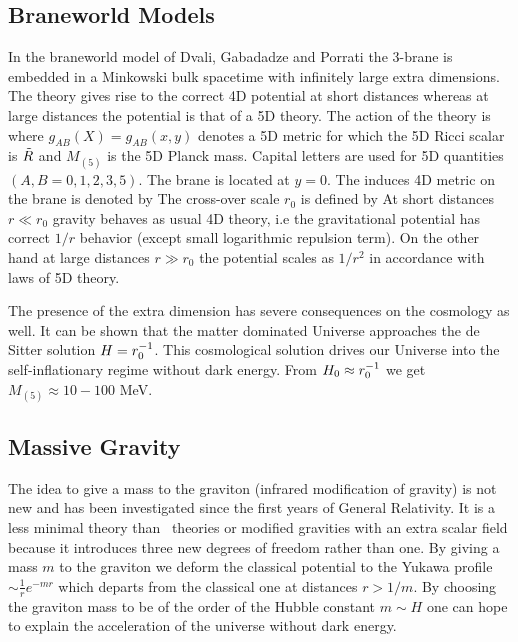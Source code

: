 \subsection{Braneworld Models}
In the braneworld model of Dvali, Gabadadze and Porrati \parencite[DGP model][]{2000PhLB..485..208D} the 3-brane is embedded in a Minkowski bulk spacetime with infinitely large extra dimensions. The theory gives rise to the correct 4D potential at short distances whereas at large distances the potential is that of a 5D theory. The action of the theory is
where $g_{AB}(X)=g_{AB}(x,y)$ denotes a 5D metric for which the 5D Ricci scalar is ${\tilde{R}}$ and $M_{(5)}$ is the 5D Planck mass. Capital letters are used for 5D quantities $(A,B=0,1,2,3,5)$. The brane is located at $y=0$. The induces 4D metric on the brane is denoted by
The cross-over scale $r_0$ is defined by
At short distances $r\ll r_0$ gravity behaves as usual 4D theory, i.e the gravitational potential has correct $1/r$ behavior (except small logarithmic repulsion term). On the other hand at large distances $r\gg r_0$ the potential scales as $1/r^2$ in accordance with laws of 5D theory.

The presence of the extra dimension has severe consequences on the cosmology as well. It can be shown \parencite{2010deto.book.....A,2009PhLB..674..237M} that the matter dominated Universe approaches the de Sitter solution $H=r_0^{-1}$. This cosmological solution drives our Universe into the self-inflationary regime without dark energy. From $H_0\approx r_0^{-1}$ we get $M_{(5)}\approx10-100$ MeV.
\subsection{Massive Gravity}
The idea to give a mass to the graviton (infrared modification of gravity) is not new and has been investigated since the first years of General Relativity. It is a less minimal theory than \fR\ theories or modified gravities with an extra scalar field because it introduces three new degrees of freedom rather than one. By giving a mass $m$ to the graviton we deform the classical potential to the Yukawa profile $\sim\frac1r e^{-mr}$ which departs from the classical one at distances $r>1/m$. By choosing the graviton mass to be of the order of the Hubble constant $m\sim H$ one can hope to explain the acceleration of the universe without dark energy.

